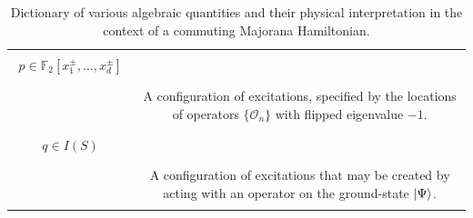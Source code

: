 \documentclass[aps,twocolumn,preprintnumbers,floatfix,showpacs,prx]{revtex4-1}
\begin{document}
\begin{table}
\begin{tabular}{|c|c|}
    \hline & \\
   $\begin{array}{c} p\in\mathbb{F}_{2}[x_{1}^{\pm},\ldots,x_{d}^{\pm}]\\\end{array}$ & \\ & \parbox[c]{3.8cm}{\vspace{-1.1\baselineskip}\raggedright A configuration of excitations, specified by the locations of operators $\{\mathcal{O}_{n}\}$ with flipped eigenvalue $-1$.} \\ & \\
   \hline & \\
   $\begin{array}{c} q \in I(S)\\\end{array}$ & \\ & \parbox[c]{4cm}{\vspace{-1.1\baselineskip}\raggedright A configuration of excitations that may be created by acting with an operator on the ground-state $\ket{\Psi}$.}\\ & \\
   \hline 
  \end{tabular}
\caption{Dictionary of various algebraic quantities and their physical interpretation in the context of a commuting Majorana Hamiltonian. \label{tab:Alg_Dictionary}}
\end{table}
\end{document}
